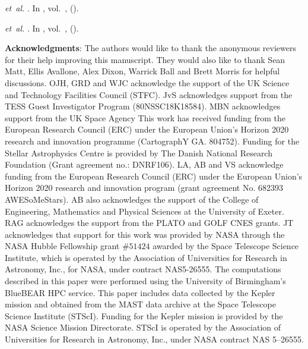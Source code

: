\documentclass[12pt]{article}
\begin{document}
\begin{thebibliography}{10}
	 \emph{et~al.}
	\newblock {}.
	\newblock In \emph{},
	vol.~,  ().
	
	 \emph{et~al.}
	\newblock {}.
	\newblock In \emph{},
	vol.~,  ().
	
	
\end{thebibliography}


\vspace{5mm}

\textbf{Acknowledgments}: The authors would like to thank the anonymous reviewers for their help improving this manuscript. They would also like to thank Sean Matt, Ellis Avallone, Alex Dixon, Warrick Ball and Brett Morris for helpful discussions.
OJH, GRD and WJC acknowledge the support of the UK Science and Technology Facilities Council (STFC). 
JvS acknowledges support from the TESS Guest Investigator Program (80NSSC18K18584).
MBN acknowledges support from the UK Space Agency
This work has received funding from the European Research Council (ERC) under the European Union's Horizon 2020 research and innovation programme (CartographY GA. 804752).
Funding for the Stellar Astrophysics Centre is provided by The Danish National Research Foundation (Grant agreement no.: DNRF106). 
LA, AB and VS acknowledge funding from the European Research Council (ERC) under the European Union's Horizon 2020 research and innovation program (grant agreement No. 682393 AWESoMeStars). AB also acknowledges the support of the College of Engineering, Mathematics and Physical Sciences at the University of Exeter.
RAG acknowledges the support from the PLATO and GOLF CNES grants.
JT acknowledges that support for this work was provided by NASA through the NASA Hubble Fellowship grant $\#51424$ awarded by the Space Telescope Science Institute, which is operated by the Association of Universities for Research in Astronomy, Inc., for NASA, under contract NAS5-26555.
The computations described in this paper were performed using the University of Birmingham's BlueBEAR HPC service.
This paper includes data collected by the Kepler mission and obtained from the MAST data archive at the Space Telescope Science Institute (STScI). Funding for the Kepler mission is provided by the NASA Science Mission Directorate. STScI is operated by the Association of Universities for Research in Astronomy, Inc., under NASA contract NAS 5–26555.\\
\end{document}
